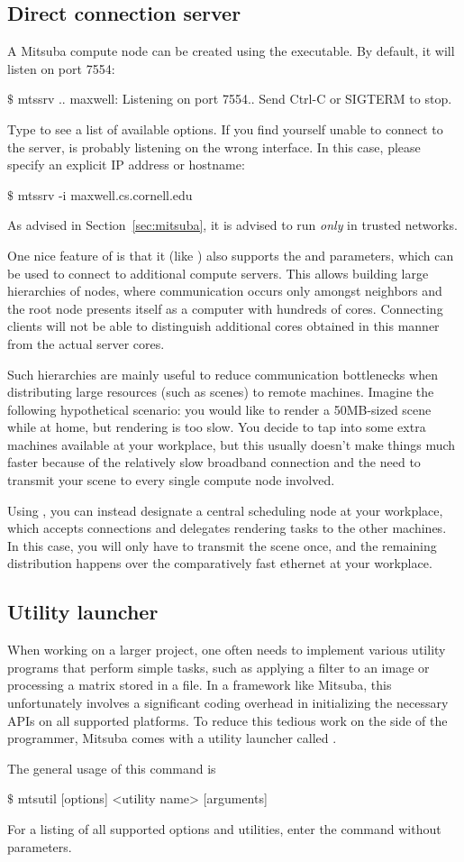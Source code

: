 \subsection{Direct connection server}
A Mitsuba compute node can be created using the  executable. By default,
it will listen on port 7554:
\begin{shell}
$\texttt{\$}$ mtssrv
..
maxwell: Listening on port 7554.. Send Ctrl-C or SIGTERM to stop.
\end{shell}
Type  to see a list of available options.
If you find yourself unable to connect to the server,  is probably listening on
the wrong interface. In this case, please specify an explicit IP address or hostname:
\begin{shell}
$\texttt{\$}$ mtssrv -i maxwell.cs.cornell.edu
\end{shell}
As advised in Section~\ref{sec:mitsuba}, it is advised to run  \emph{only} in trusted networks.

One nice feature of  is that it (like ) also supports the  and  
parameters, which can be used to connect to additional compute servers. 
This allows building large hierarchies of nodes,
where communication occurs only amongst neighbors and the root node presents itself as
a computer with hundreds of cores.
Connecting clients will not be able to distinguish additional cores obtained in this manner  
from the actual server cores. 

Such hierarchies are mainly useful to reduce communication bottlenecks when distributing
large resources (such as scenes) to remote machines. Imagine the following hypothetical scenario:
you would like to render a 50MB-sized scene while at home, but rendering is too slow. 
You decide to tap into some extra machines available
at your workplace, but this usually doesn't make things much faster because of the relatively slow broadband
connection and the need to transmit your scene to every single compute node involved. 

Using , you can
instead designate a central scheduling node at your workplace, which accepts connections and delegates
rendering tasks to the other machines. In this case, you will only have to transmit the scene once,
and the remaining distribution happens over the comparatively fast ethernet at your workplace.
\subsection{Utility launcher}
\label{sec:mtsutil}
When working on a larger project, one often needs to implement various utility programs that 
perform simple tasks, such as applying a filter to an image or processing
a matrix stored in a file. In a framework like Mitsuba, this unfortunately involves 
a significant coding overhead in initializing the necessary APIs on all supported platforms. 
To reduce this tedious work on the side of the programmer, Mitsuba comes with a utility launcher
called .

The general usage of this command is
\begin{shell}
$\texttt{\$}$ mtsutil [options] <utility name> [arguments]
\end{shell}
For a listing of all supported options and utilities, enter the command without parameters.
